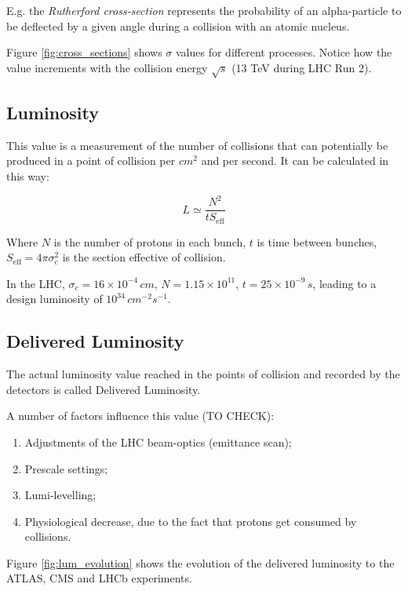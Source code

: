 E.g. the \textit{Rutherford cross-section} represents the probability of an alpha-particle to be deflected by a given angle during a collision with an atomic nucleus.


Figure \ref{fig:cross_sections} shows $\sigma$ values for different processes. Notice how the value increments with the collision energy $\sqrt s$ (13 TeV during LHC Run 2).

\subsection{Luminosity}

This value is a measurement of the number of collisions that can potentially be produced in a point of collision per $cm^2$ and per second. It can be calculated in this way:

\begin{equation}
	L \simeq  \frac{N^2}{t S_{\text{eff}}}
\end{equation}

Where $N$ is the number of protons in each bunch, $t$ is time between bunches, $S_{\text{eff}} = 4 \pi \sigma_c^2$ is the section effective of collision.

In the LHC, $\sigma _c= 16\times 10^{-4}\, cm$, $N = 1.15\times10^{11}$, $t = 25 \times 10^{-9}\, s$, leading to a design luminosity of $10^{34}\, cm^{-2}s^{-1}$.

\subsection{Delivered Luminosity}

The actual luminosity value reached in the points of collision and recorded by the detectors is called Delivered Luminosity.

A number of factors influence this value (TO CHECK):

\begin{enumerate}
	\item Adjustments of the LHC beam-optics (emittance scan);
	\item Prescale settings;
	\item Lumi-levelling;
	\item Physiological decrease, due to the fact that protons get consumed by collisions.
\end{enumerate}

Figure \ref{fig:lum_evolution} shows the evolution of the delivered luminosity to the ATLAS, CMS and LHCb experiments.


